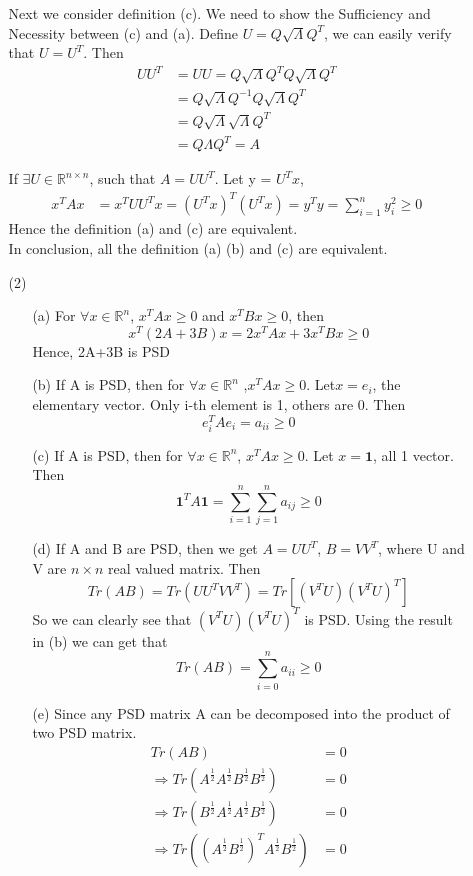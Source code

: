 \documentclass[a4paper,12pt]{article}
\begin{document}
\begin{enumerate}
\begin{itemize}
Next we consider definition (c). We need to show the Sufficiency and Necessity between (c) and (a).
\subitem [Sufficiency]
Define $U = Q \sqrt{\Lambda} Q^T$, we can easily verify that $U = U^T$. Then
\begin{align*}
U U^T &= U U =  Q \sqrt{\Lambda} Q^T Q \sqrt{\Lambda} Q^T \\
	    &= Q \sqrt{\Lambda} Q^{-1} Q \sqrt{\Lambda} Q^T \\
	    &=Q \sqrt{\Lambda} \sqrt{\Lambda} Q^T \\
	    &=Q \Lambda Q^T = A
\end{align*}

\subitem [Necessity]
If $\exists U \in \mathbb{R}^{n\times n}$, such that $ A = U  U^T$. Let y = $U^T x$, 
\begin{align*}
x^T A x &= x^T U U^T x  = (U^T x)^T (U^T x) = y^T y = \sum_{i=1}^n y_i^2 \ge 0
\end{align*}
Hence the definition (a) and (c) are equivalent.\\
In conclusion, all the definition (a) (b) and (c) are equivalent.

\clearpage
\item[(2)]

\begin{itemize}
\item[(a)]
For $\forall x \in  \mathbb{R}^n$, $x^T A x \ge 0$ and $x^T B x \ge 0$, then
$$
x^T (2A+3B) x = 2 x^T A x + 3 x^T B x \ge 0
$$
Hence, 2A+3B is PSD

\item[(b)]
If A is PSD, then for $\forall x \in  \mathbb{R}^n $ ,$x^T A x \ge 0$. Let$ x = e_i$, the elementary vector. Only i-th element is 1, others are 0. Then
$$
e_i^T A e_i = a_{ii} \ge 0
$$

\item[(c)]
If A is PSD, then for $\forall x \in \mathbb{R}^n $, $x^T A x \ge 0$. Let $x = \mathbf{1}$, all 1 vector. Then
$$
\mathbf{1}^T A \mathbf{1} = \sum_{i=1}^n \sum_{j=1}^n a_{ij} \ge 0
$$

\item[(d)]
If A and B are PSD, then we get $A = U U^T$, $B = V V^T$, where U and V are $n \times n$ real valued matrix. Then
$$
Tr(AB) = Tr(U U^T V V^T) = Tr[(V^T U)( V^T U)^T]
$$
So we can clearly see that $(V^T U)( V^T U)^T$ is PSD. Using the result in (b) we can get that
$$
Tr(AB) = \sum_{i=0}^n a_{ii} \ge 0
$$

\item[(e)]
\subitem [Sufficiency]
Since any PSD matrix A can be decomposed into the product of two PSD matrix.
\begin{align*}
Tr(AB) &= 0 \\
\Rightarrow Tr(A^{\frac{1}{2}} A^{\frac{1}{2}} B^{\frac{1}{2}} B^{\frac{1}{2}}) &=0 \\
\Rightarrow Tr(B^{\frac{1}{2}} A^{\frac{1}{2}} A^{\frac{1}{2}} B^{\frac{1}{2}}) &=0 \\
\Rightarrow Tr( (A^{\frac{1}{2}} B^{\frac{1}{2}})^T A^{\frac{1}{2}} B^{\frac{1}{2}}) &=0 
\end{align*}


\end{itemize}
\end{itemize}
\end{enumerate}
\end{document}
